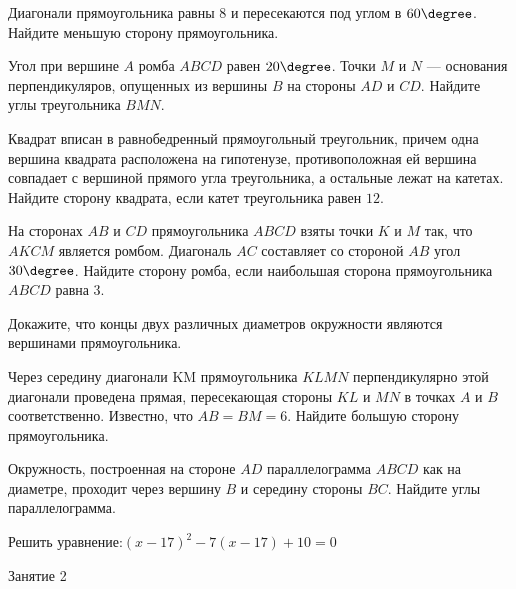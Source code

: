 %
%

\begin{class}[number=1]
	\begin{listofex}
		\item Диагонали прямоугольника равны \( 8 \) и пересекаются
		под углом в \( 60\degree \).
		Найдите меньшую сторону прямоугольника.
		\item Угол при вершине \( A \) ромба \( ABCD \) равен \( 20\degree \). Точки \( M \) и \( N \) --- основания перпендикуляров, опущенных из вершины \( B \) на стороны \( AD \) и \( CD \).
		Найдите углы треугольника \( BMN \).
		\item Квадрат вписан в равнобедренный прямоугольный
		треугольник, причем одна вершина квадрата расположена на
		гипотенузе, противоположная ей вершина совпадает с вершиной
		прямого угла треугольника, а остальные лежат на катетах.
		Найдите сторону квадрата, если катет треугольника равен \( 12 \).
		\item На сторонах \( AB \) и \( CD \) прямоугольника \( ABCD \)
		взяты точки \( K \) и \( M \) так, что \( AKCM \) является ромбом.
		Диагональ \( AC \) составляет со стороной \( AB \) угол \( 30\degree \). Найдите сторону ромба, если наибольшая сторона прямоугольника \( ABCD \) равна \( 3 \).
		\item Докажите, что концы двух различных диаметров
		окружности являются вершинами прямоугольника.
		\item Через середину диагонали KM прямоугольника
		\( KLMN \) перпендикулярно этой диагонали проведена прямая,
		пересекающая стороны \( KL \) и \( MN \) в точках \( A \) и \( B \)
		соответственно. Известно, что \( AB = BM = 6 \).
		Найдите большую сторону прямоугольника.
		\item Окружность, построенная на стороне \( AD \)
		параллелограмма \( ABCD \) как на диаметре, проходит через вершину \( B \) и
		середину стороны \( BC \). Найдите углы параллелограмма.
		\item Решить уравнение:\quad\( (x-17)^2-7(x-17)+10=0 \)
	\end{listofex}
\end{class}

\begin{class}[number=2]
	\begin{listofex}
		\item Занятие 2
	\end{listofex}
\end{class}


